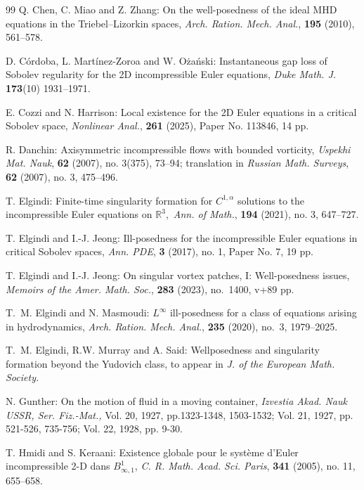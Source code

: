 \documentclass[11pt]{amsart}
\newcommand{\R}{{\mathbb R}}
\numberwithin{equation}{section}
\begin{document}
\begin{thebibliography}{99}
 Q. Chen, C. Miao and Z. Zhang: On the well-posedness of the ideal MHD equations in the Triebel–Lizorkin spaces, 
\emph{Arch. Ration. Mech. Anal.}, {\bf 195} (2010), 561–578. 
 
   D. C\'{o}rdoba, L. Mart\'{i}nez-Zoroa and W. O\.{z}a\'{n}ski: {Instantaneous gap loss of Sobolev regularity for the 2D incompressible Euler equations}, \emph{Duke Math. J.} {\bf 173}(10) 1931--1971. 
 
  E. Cozzi and N.  Harrison:
Local existence for the 2D Euler equations in a critical Sobolev space,
\emph{Nonlinear Anal.}, {\bf 261} (2025), Paper No. 113846, 14 pp. 
 
  R. Danchin:  Axisymmetric incompressible flows with bounded vorticity, \emph{Uspekhi Mat. Nauk}, {\bf  62} (2007), no. 3(375), 73–94; translation in \emph{Russian Math. Surveys}, {\bf 62} (2007), no. 3, 475–496.
 
  T. Elgindi: Finite-time singularity formation for  $C^{1,\alpha}$  solutions to the incompressible Euler equations on
 $\R^3,$  \emph{Ann. of Math.}, {\bf 194} (2021), no. 3, 647--727. 
 
 T. Elgindi and  I.-J. Jeong:
Ill-posedness for the incompressible Euler equations in critical Sobolev spaces, \emph{Ann. PDE}, {\bf 3} (2017), no. 1, Paper No. 7, 19 pp. 
   
     T. Elgindi and  I.-J. Jeong:
    On singular vortex patches, I: Well-posedness issues, \emph{Memoirs of the  Amer. Math. Soc.},  {\bf 283} (2023), no.~1400, v+89 pp.
    
     T.~M. Elgindi and N. Masmoudi: $L^\infty$ ill-posedness for a class of equations arising in hydrodynamics, 
    \emph{Arch. Ration. Mech. Anal.},  {\bf 235} (2020), no.~3, 1979--2025. 
    
 T.~M. Elgindi, R.W. Murray and A. Said: Wellposedness and singularity formation beyond the Yudovich class, 
to appear in \emph{J. of the European Math. Society.}
    
       N. Gunther: { On the motion of fluid in a moving container}, \emph{Izvestia Akad. Nauk USSR, Ser. Fiz.-Mat.,} Vol. 20, 1927, pp.1323-1348, 1503-1532; Vol. 21, 1927, pp. 521-526, 735-756; Vol.     22, 1928, pp. 9-30.
    
     T. Hmidi and S. Keraani:  Existence globale pour le système d'Euler incompressible 2-D dans 
    $B^1_{\infty,1}$, \emph{C. R. Math. Acad. Sci. Paris}, {\bf 341} (2005), no. 11, 655–658.
   

\end{thebibliography}
\end{document}
